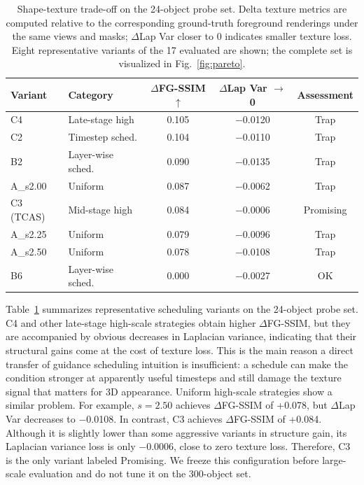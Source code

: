 \documentclass[times,twocolumn,final]{elsarticle}
\begin{document}
\begin{table}[t]
\centering
\caption{Shape-texture trade-off on the 24-object probe set. Delta texture metrics are computed relative to the corresponding ground-truth foreground renderings under the same views and masks; $\Delta$Lap Var closer to 0 indicates smaller texture loss. Eight representative variants of the 17 evaluated are shown; the complete set is visualized in Fig.~\ref{fig:pareto}.}
\label{tab:probe}
\footnotesize\setlength{\tabcolsep}{3pt}
\begin{tabular}{llccc}
\toprule
Variant & Category & $\Delta$FG-SSIM$\uparrow$ & $\Delta$Lap Var $\to$ 0 & Assessment \\
\midrule
C4 & Late-stage high & 0.105 & $-$0.0120 & Trap \\
C2 & Timestep sched. & 0.104 & $-$0.0110 & Trap \\
B2 & Layer-wise sched. & 0.090 & $-$0.0135 & Trap \\
A\_s2.00 & Uniform & 0.087 & $-$0.0062 & Trap \\
C3 (TCAS) & Mid-stage high & 0.084 & $-$0.0006 & Promising \\
A\_s2.25 & Uniform & 0.079 & $-$0.0096 & Trap \\
A\_s2.50 & Uniform & 0.078 & $-$0.0108 & Trap \\
B6 & Layer-wise sched. & 0.000 & $-$0.0027 & OK \\
\bottomrule
\end{tabular}
\end{table}

Table~\ref{tab:probe} summarizes representative scheduling variants on the 24-object probe set. C4 and other late-stage high-scale strategies obtain higher $\Delta$FG-SSIM, but they are accompanied by obvious decreases in Laplacian variance, indicating that their structural gains come at the cost of texture loss. This is the main reason a direct transfer of guidance scheduling intuition is insufficient: a schedule can make the condition stronger at apparently useful timesteps and still damage the texture signal that matters for 3D appearance. Uniform high-scale strategies show a similar problem. For example, $s = 2.50$ achieves $\Delta$FG-SSIM of +0.078, but $\Delta$Lap Var decreases to $-$0.0108. In contrast, C3 achieves $\Delta$FG-SSIM of +0.084. Although it is slightly lower than some aggressive variants in structure gain, its Laplacian variance loss is only $-$0.0006, close to zero texture loss. Therefore, C3 is the only variant labeled Promising. We freeze this configuration before large-scale evaluation and do not tune it on the 300-object set.
\end{document}
